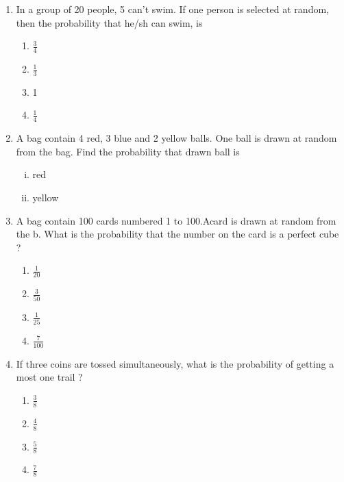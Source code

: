 \begin{enumerate}
\begin{enumerate}
                        \end{enumerate}
        \item In a group of 20 people, 5 can't swim. If one person is selected at random, then the probability that he/sh can swim, is
                        \begin{enumerate}
                                \item $ \frac {3} {4} $
                                \item $ \frac {1} {3} $
                                \item 1
                                \item $ \frac {1} {4} $
                        \end{enumerate}
        \item A bag contain 4 red, 3 blue and 2 yellow balls. One ball is drawn at random from the bag. Find the probability that drawn ball is
                \begin{enumerate}[(i)]
                                        \item red
                                        \item yellow
                \end{enumerate}
        \item A bag contain 100 cards numbered 1 to 100.Acard is drawn at random from the b. What is the probability that the number on the card is a perfect cube ?
                        \begin{enumerate}
                                \item $ \frac {1} {20} $
                                \item $ \frac {3} {50} $
                                \item $ \frac {1} {25} $
                                \item $ \frac {7} {100} $
                        \end{enumerate}
        \item If three coins are tossed simultaneously, what is the probability of getting a most one trail ?
                        \begin{enumerate}
                                \item $ \frac {3} {8} $
                                \item $ \frac {4} {8} $
                                \item $ \frac {5} {8} $
                                \item $ \frac {7} {8} $

\end{enumerate}
\end{enumerate}
